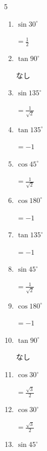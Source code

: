 \begin{multicols}{5}
\begin{enumerate}
        $\displaystyle =\frac{\sqrt{3}}{2}$

  \item $\displaystyle \sin{30^\circ}$

        $\displaystyle =\frac{1}{2}$

  \item $\displaystyle \tan{90^\circ}$

        $\displaystyle なし$

  \item $\displaystyle \sin{135^\circ}$

        $\displaystyle =\frac{1}{\sqrt{2}}$

  \item $\displaystyle \tan{135^\circ}$

        $\displaystyle =-1$

  \item $\displaystyle \cos{45^\circ}$

        $\displaystyle =\frac{1}{\sqrt{2}}$

  \item $\displaystyle \cos{180^\circ}$

        $\displaystyle =-1$

  \item $\displaystyle \tan{135^\circ}$

        $\displaystyle =-1$

  \item $\displaystyle \sin{45^\circ}$

        $\displaystyle =\frac{1}{\sqrt{2}}$

  \item $\displaystyle \cos{180^\circ}$

        $\displaystyle =-1$

  \item $\displaystyle \tan{90^\circ}$

        $\displaystyle なし$

\columnbreak %

  \item $\displaystyle \cos{30^\circ}$

        $\displaystyle =\frac{\sqrt{3}}{2}$

  \item $\displaystyle \cos{30^\circ}$

        $\displaystyle =\frac{\sqrt{3}}{2}$

  \item $\displaystyle \sin{45^\circ}$


\end{enumerate}
\end{multicols}
